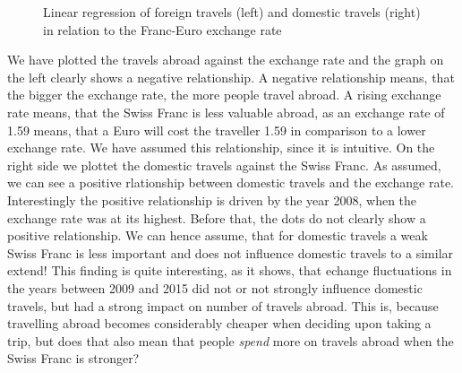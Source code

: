 \documentclass[12pt,a4paper,bibliography=totocnumbered,listof=totocnumbered]{scrartcl}
\begin{document}
\begin{figure}
\caption{Linear regression of foreign travels (left) and domestic travels (right) in relation to the Franc-Euro exchange rate}
\end{figure}
We have plotted the travels abroad against the exchange rate and the graph on the left clearly shows a negative relationship. A negative relationship means, that the bigger the exchange rate, the more people travel abroad. A rising exchange rate means, that the Swiss Franc is less valuable abroad, as an exchange rate of 1.59 means, that a Euro will cost the traveller 1.59 in comparison to a lower exchange rate. We have assumed this relationship, since it is intuitive. On the right side we plottet the domestic travels against the Swiss Franc. As assumed, we can see a positive rlationship between domestic travels and the exchange rate. Interestingly the positive relationship is driven by the year 2008, when the exchange rate was at its highest. Before that, the dots do not clearly show a positive relationship. We can hence assume, that for domestic travels a weak Swiss Franc is less important and does not influence domestic travels to a similar extend! This finding is quite interesting, as it shows, that echange fluctuations in the years between 2009 and 2015 did not or not strongly influence domestic travels, but had a strong impact on number of travels abroad. This is, because travelling abroad becomes considerably cheaper when deciding upon taking a trip, but does that also mean that people \textit{spend} more on travels abroad when the Swiss Franc is stronger? 
\end{document}
